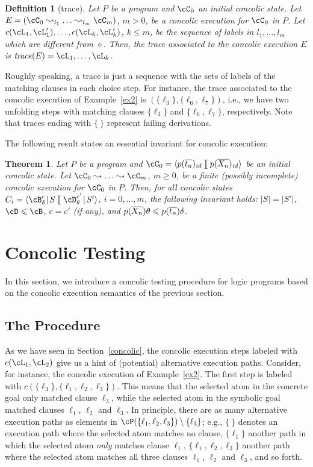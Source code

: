 \documentclass[fleqn]{tlp}
\newtheorem{definition}{Definition} \newtheorem{example}{Example} \newtheorem{lemma}{Lemma} \newtheorem{proposition}{Proposition} \newtheorem{theorem}{Theorem} \newtheorem{corollary}{Corollary}
\newcommand{\trace}{\mathit{trace}}
\newcommand{\id}{{\mathit{id}}}
\newcommand{\sgeq}{\geqslant}
\newcommand{\sleq}{\leqslant}
\newcommand{\midd}{\!\mid\!}
\newcommand{\sep}{\mathit{\;]\![\;}}
\def \tuple#1{\langle #1 \rangle}
\begin{document}
\begin{definition}[trace]
  Let $P$ be a program and $\cC_0$ an initial concolic state. Let $E =
  (\cC_0 \leadsto_{l_1} \ldots \leadsto_{l_m} \cC_m)$, $m>0$, be a
  concolic execution for $\cC_0$ in $P$. Let
  $c(\cL_1,\cL'_1),\ldots,c(\cL_k,\cL'_k)$, $k\sleq m$, be the
  sequence of labels in $l_1,\ldots,l_m$ which are different from
  $\diamond$. Then, the trace associated to the concolic execution $E$
  is $\trace(E) = \cL_1,\ldots,\cL_k$.
\end{definition}
Roughly speaking, a trace is just a sequence with the sets of labels
of the matching clauses in each choice step.
For instance, the trace associated to the concolic execution of
Example~\ref{ex2} is $(\{\ell_3\},\{\ell_6,\ell_7\})$, i.e., we have
two unfolding steps with matching clauses $\{\ell_3\}$ and
$\{\ell_6,\ell_7\}$, respectively.
Note that traces ending with $\{\:\}$ represent failing derivations.

The following result states an essential invariant for concolic execution:

\begin{theorem} \label{th:invariant} Let $P$ be a program and $\cC_0 =
  \tuple{p(\ol{t_n})_\id \sep p(\ol{X_n})_\id }$ be an initial
  concolic state. Let $\cC_0 \leadsto \ldots \leadsto \cC_m$, $m\sgeq 0$,
  be a finite (possibly incomplete) concolic execution for $\cC_0$ in
  $P$. Then, for all concolic states $C_i= \tuple{\cB^c_\delta\midd
    S\sep \cD^{c'}_\theta\midd S'}$, $i=0,\ldots,m$, the following
  invariant holds: $|S|=|S'|$, $\cD\sleq \cB$, $c=c'$ (if any), and
  $p(\ol{X_n})\theta \sleq p(\ol{t_n})\delta$.
\end{theorem}

\section{Concolic Testing} \label{testing}

In this section, we introduce a concolic testing procedure for logic
programs based on the concolic execution semantics of the previous
section.

\subsection{The Procedure}

As we have seen in Section~\ref{concolic}, the concolic execution
steps labeled with $c(\cL_1,\cL_2)$ give us a hint of (potential)
alternative execution paths. Consider, for instance, the concolic
execution of Example~\ref{ex2}. The first step is labeled with
$c(\{\ell_3\},\{\ell_1,\ell_2,\ell_3\})$. This means that the selected
atom in the concrete goal only matched clause $\ell_3$, while the
selected atom in the symbolic goal matched clauses $\ell_1$, $\ell_2$
and $\ell_3$. In principle, there are as many alternative execution
paths as elements in
$\cP(\{\ell_1,\ell_2,\ell_3\})\:\backslash\:\{\ell_3\}$; e.g.,
$\{\:\}$ denotes an execution path where the selected atom matches no
clause, $\{\ell_1\}$ another path in which the selected atom
\emph{only} matches clause $\ell_1$, $\{\ell_1,\ell_2,\ell_3\}$
another path where the selected atom matches all three clauses
$\ell_1$, $\ell_2$ and $\ell_3$, and so forth.
\end{document}
